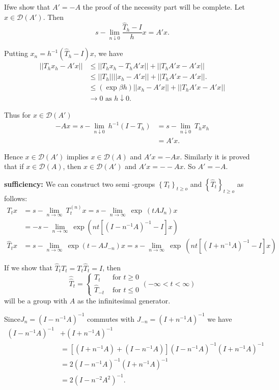  If\pageoriginale we show that $A' =-A$ the proof of the necessity part will be
 complete. Let $x \in \mathscr{D}(A')$. Then 
 $$
 s-\lim\limits_{n \downarrow 0} \frac{\hat{T}_h -I}{h} x= A'x.
 $$
 
Putting $x_n= h^{-1}(\hat{T}_h -I)x$, we have 
\begin{align*}
 || T_h x_h - A' x|| &\le || T_h x_h -T_h A' x || + || T_h A' x-A'
 x || \\ 
 & \le || T_h || || x_h -A' x || + || T_h A' x-A' x ||.\\
 & \le (\exp \beta h) || x_h -A' x || + || T_h A' x-A' x || \\
 & \to 0 \text{ as } h \downarrow 0.
\end{align*} 
 
Thus for $x \in \mathscr{D}(A')$
\begin{align*}
 -A x= s-\lim_{n \downarrow 0}~ h^{-1}(I- T_h) &= s-\lim_{n
  \downarrow 0} ~T_h x_h \\ 
 &= A'x.
 \end{align*}
 
Hence $x \in \mathscr{D}(A')$ implies $x \in \mathscr{D}(A)$ and
$A'x=-Ax$. Similarly it is proved that if $x \in \mathscr{D}(A)$, then
$x \in \mathscr{D}(A')$ and $A'x=- -Ax$. So $A' =-A$. 

\medskip
\noindent \textbf{sufficiency: }
 We can construct two semi -groups $\left\{T_t\right\}_{t \ge o}$ and
 $\left\{ \hat{T}_t\right\}_{t \ge o}$ as follows: 
 \begin{align*}
  T_t x & =s-\lim_{n\to \infty}~T_t^{(n)}x= s-\lim_{n\to \infty}~ \exp
  ~(t A J_n) x\\
  & =- s-\lim_{n\to \infty} ~\exp (nt [(I-n^{-1}A)^{-1}-I]x)\\ 
  \hat{T}_t x &= s-\lim_{n\to \infty}~ \exp (t-A J_{-n}) x=
  s-\lim_{n\to \infty}~ \exp ~(nt[(I+n^{-1}A)^{-1} -I]x) 
 \end{align*} 
  
 If we show that $\hat{T}_t T_t = T_t \hat{T}_t =I$, then 
 \begin{equation*}
  \hat{\hat{T}}_t = 
  \begin{cases}
   T_t &\text{ for } t \ge 0 \\
   \hat{T}_{-t} &\text{ for } t \le 0
  \end{cases}
  (- \infty < t < \infty )
 \end{equation*} 
 will be a group with $A$ as the infinitesimal generator. 
   
Since\pageoriginale $J_n= (I- n^{-1}A)^{-1}$ commutes with $J_{-n}= (I +n^{-1}A)^{-1}$ we have 
\begin{align*}
 (I-n^{-1}A)^{-1} & + (I +n^{-1}A)^{-1}\\ 
 &= [(I+n^{-1}A)+
  (I-n^{-1}A)](I-n^{-1}A)^{-1}(I+n^{-1}A)^{-1} \\ 
 &= 2 (I- n^{-1}A)^{-1} (I +n^{-1}A)^{-1}\\
 &= 2(I -n^{-2} A^2)^{-1}.
\end{align*} 
    
